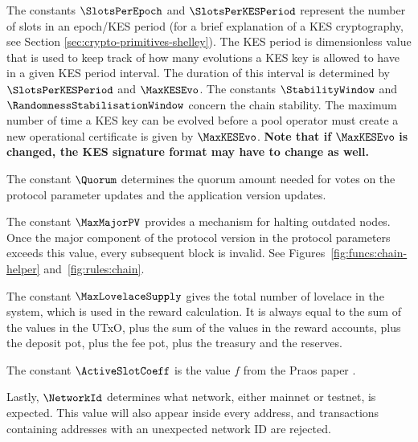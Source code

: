 The constants $\SlotsPerEpoch$ and $\SlotsPerKESPeriod$
represent the number of slots in an epoch/KES period (for a brief explanation
of a KES cryptography, see Section \ref{sec:crypto-primitives-shelley}). The KES period is
dimensionless value that is used to keep track of how many evolutions a KES key is allowed
to have in a given KES period interval. The duration of this interval is determined by
$\SlotsPerKESPeriod$ and $\MaxKESEvo$.
The constants $\StabilityWindow$ and $\RandomnessStabilisationWindow$ concern the chain stability.
The maximum number of time a KES key can be evolved before a pool operator
must create a new operational certificate is given by $\MaxKESEvo$.
\textbf{Note that if } $\MaxKESEvo$
\textbf{is changed, the KES signature format may have to change as well.}

The constant $\Quorum$ determines the quorum amount needed for votes on the
protocol parameter updates and the application version updates.

The constant $\MaxMajorPV$ provides a mechanism for halting outdated nodes.
Once the major component of the protocol version in the protocol parameters
exceeds this value, every subsequent block is invalid.
See Figures~\ref{fig:funcs:chain-helper} and~\ref{fig:rules:chain}.

The constant $\MaxLovelaceSupply$ gives the total number of lovelace in the system,
which is used in the reward calculation.
It is always equal to the sum of the values in the UTxO, plus the sum of the
values in the reward accounts, plus the deposit pot, plus the fee pot,
plus the treasury and the reserves.

The constant $\ActiveSlotCoeff$ is the value $f$ from the
Praos paper \cite{ouroboros_praos}.

Lastly, $\NetworkId$ determines what network, either mainnet or testnet, is expected.
This value will also appear inside every address, and transactions
containing addresses with an unexpected network ID are rejected.

